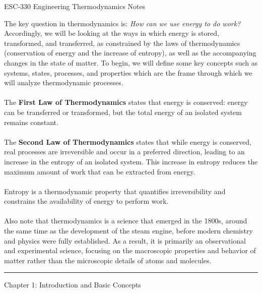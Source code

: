 \documentclass[12pt]{article}
\title{}
\date{}
\author{}
\begin{document}
\begin{center}
{\LARGE ESC-330 Engineering Thermodynamics Notes\par}
\end{center}
The key question in thermodynamics is: \textit{How can we use energy to do work?} Accordingly, we will be looking at the ways in which energy is stored, transformed, and transferred, as constrained by the laws of thermodynamics (conservation of energy and the increase of entropy), as well as the accompanying changes in the state of matter. To begin, we will define some key concepts such as systems, states, processes, and properties which are the frame through which we will analyze thermodynamic processes.\\\\
The \textbf{First Law of Thermodynamics} states that energy is conserved: energy can be transferred or transformed, but the total energy of an isolated system remains constant.\\\\
The \textbf{Second Law of Thermodynamics} states that while energy is conserved, real processes are irreversible and occur in a preferred direction, leading to an increase in the entropy of an isolated system. This increase in entropy reduces the maximum amount of work that can be extracted from energy.\\\\
Entropy is a thermodynamic property that quantifies irreversibility and constrains the availability of energy to perform work.\\\\
Also note that thermodynamics is a science that emerged in the 1800s, around the same time as the development of the steam engine, before modern chemistry and physics were fully established. As a result, it is primarily an observational and experimental science, focusing on the macroscopic properties and behavior of matter rather than the microscopic details of atoms and molecules.
\vspace{1em}
\noindent\hrule
\vspace{1em}
\begin{center}
{\LARGE Chapter 1: Introduction and Basic Concepts\par}
\end{center}
\end{document}
